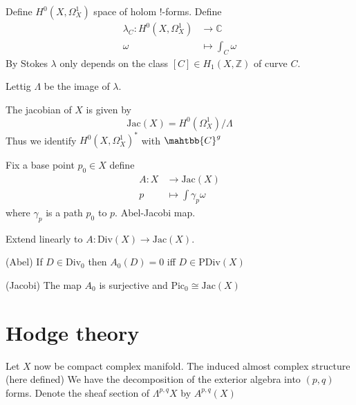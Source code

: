 Define $H^0 ( X, \Omega_X ^ 1) $ space of holom !-forms.
Define 
\begin{align}
    \lambda _ C : H^0 ( X, \Omega_X ^1 ) & \rightarrow  \mathbb{C} \\
    \omega & \mapsto \int _C \omega
\end{align}
By Stokes $\lambda$ only depends on the class $[C] \in H_1 (X, \mathbb{Z} ) $ of curve $C$. 

Lettig $ \Lambda$ be the image of $\lambda$.

\begin{definition}
The jacobian of $ X$ is given by 
    \begin{equation}
        \mathrm{Jac}(X) = H^0 (\Omega^1 _X )/ \Lambda
    \end{equation}
    Thus we identify $H^0 ( X, \Omega^1 _X) ^* $ with $ \mahtbb{C} ^ g$
\end{definition}

\begin{definition}
    Fix a base point $ p_0 \in X $ define 
    \begin{align}
        A: X & \rightarrow \mathrm{Jac}(X) \\
        p & \mapsto \int \gamma_p \omega 
    \end{align}
    where $ \gamma_p $ is a path $p_0 $ to $p $. 
    Abel-Jacobi map.

    Extend linearly to $ A : \mathrm{Div}(X) \rightarrow \mathrm{Jac} (X) $.
\end{definition}

\begin{theorem}
    (Abel) If $D \in \mathrm{Div}_0 $ then $A_0 (D) = 0 $ iff $D \in \mathrm{PDiv}(X)$
\end{theorem}

\begin{theorem}
    (Jacobi) The map $A_0 $ is surjective and $\mathrm{Pic} _0 \cong \mathrm{Jac}(X)$ 
\end{theorem}


\section{Hodge theory } %

Let $X$ now be compact complex manifold. 
The induced almost complex structure (here defined) 
We have the decomposition of the exterior algebra into $(p,q)$ forms. 
Denote the sheaf section of $ \Lambda^{p,q} X$ by $ A^{p,q} (X) $ 


